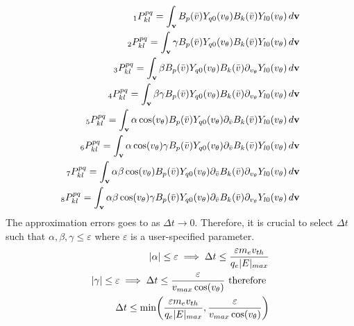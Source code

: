 \documentclass{article}[draft]
\begin{document}
\begin{align}
	{}_1P^{pq}_{kl} = \int_{\vect{v}} B_p\of{\bar{v}} Y_{q0}\of{\vtheta} B_k\of{\bar{v}} Y_{l0}\of{\vtheta} \diff{\vect{v}}\\
	{}_2P^{pq}_{kl} = \int_{\vect{v}} \gamma B_p\of{\bar{v}} Y_{q0}\of{\vtheta} B_k\of{\bar{v}} Y_{l0}\of{\vtheta} \diff{\vect{v}}\\
	{}_3P^{pq}_{kl}	= \int_{\vect{v}} \beta  B_p\of{\bar{v}} Y_{q0}\of{\vtheta} B_k\of{\bar{v}} \partial_{\vtheta}Y_{l0}\of{\vtheta} \diff{\vect{v}}\\
    {}_4P^{pq}_{kl}	= \int_{\vect{v}} \beta \gamma B_p\of{\bar{v}} Y_{q0}\of{\vtheta} B_k\of{\bar{v}} \partial_{\vtheta}Y_{l0}\of{\vtheta} \diff{\vect{v}}\\
    {}_5P^{pq}_{kl} = \int_{\vect{v}} \alpha \cos\of{\vtheta} B_p\of{\bar{v}} Y_{q0}\of{\vtheta} \partial_{\bar{v}} B_k\of{\bar{v}} Y_{l0}\of{\vtheta} \diff{\vect{v}}\\
    {}_6P^{pq}_{kl} = \int_{\vect{v}} \alpha \cos\of{\vtheta} \gamma B_p\of{\bar{v}} Y_{q0}\of{\vtheta} \partial_{\bar{v}} B_k\of{\bar{v}} Y_{l0}\of{\vtheta} \diff{\vect{v}}\\
    {}_7P^{pq}_{kl} = \int_{\vect{v}} \alpha \beta \cos\of{\vtheta} B_p\of{\bar{v}} Y_{q0}\of{\vtheta} \partial_{\bar{v}} B_k\of{\bar{v}} \partial_{\vtheta}Y_{l0}\of{\vtheta} \diff{\vect{v}}\\
    {}_8P^{pq}_{kl} = \int_{\vect{v}} \alpha \beta \cos\of{\vtheta} \gamma B_p\of{\bar{v}} Y_{q0}\of{\vtheta} \partial_{\bar{v}} B_k\of{\bar{v}} \partial_{\vtheta}Y_{l0}\of{\vtheta} \diff{\vect{v}}
\end{align}
The approximation errors goes to as $\Delta t \rightarrow 0$. Therefore, it is crucial to select $\Delta t$ such that $\alpha, \beta, \gamma \leq \varepsilon$ where $\varepsilon$ is a user-specified parameter. 
\begin{align*}
	|\alpha| \leq \varepsilon \implies \Delta t \leq \frac{\varepsilon m_e v_{th}}{q_e |E|_{max}}\\
	|\gamma| \leq \varepsilon \implies \Delta t \leq \frac{\varepsilon}{v_{max} \cos\of{\vtheta}} \text{ therefore }\\
	\Delta t \leq \min\of{\frac{\varepsilon m_e v_{th}}{q_e |E|_{max}}, \frac{\varepsilon}{v_{max} \cos\of{\vtheta}}}
\end{align*}
\end{document}
